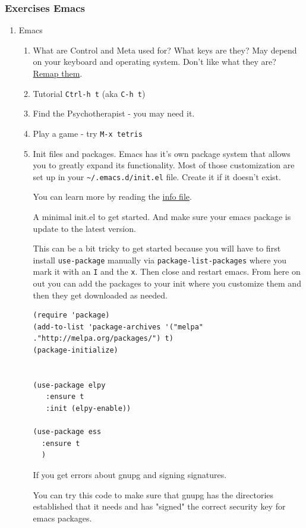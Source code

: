 \documentclass{article}
\begin{document}
\subsubsection{Exercises Emacs}
\label{sec:org3173899}
\begin{enumerate}
\item Emacs
\label{sec:orgfabaa88}
\begin{enumerate}
\item What are Control and Meta used for? What keys are they?
May depend on your keyboard and operating system. Don't like what they are? \href{https://www.x.org/releases/current/doc/man/man1/xmodmap.1.xhtml}{Remap them}.
\item Tutorial \texttt{Ctrl-h t} (aka \texttt{C-h t})
\item Find the Psychotherapist - you may need it.
\item Play a game - try \texttt{M-x tetris}
\item Init files and packages. 
Emacs has it's own package system that allows you to greatly expand its functionality. Most of those customization are set up in your \texttt{\textasciitilde{}/.emacs.d/init.el} file. Create it if it doesn't exist. 

You can learn more by reading the \href{emacs\#Init\%20File}{info file}.

A minimal init.el to get started. And make sure your emacs package is update to the latest version. 

This can be a bit tricky to get started because you will have to first install \texttt{use-package} manually via \texttt{package-list-packages} where you mark it with an \texttt{I} and the \texttt{x}. Then close and restart emacs.  From here on out you can add the packages to your init where you customize them and then they get downloaded as needed. 

\begin{verbatim}
(require 'package)
(add-to-list 'package-archives '("melpa" ."http://melpa.org/packages/") t)
(package-initialize)


(use-package elpy
   :ensure t
   :init (elpy-enable))

(use-package ess
  :ensure t
  )
\end{verbatim}

If you get errors about gnupg and signing signatures.

You can try this code to make sure that gnupg has the directories established that it needs and has "signed" the correct security key for emacs packages. 


\end{enumerate}
\end{enumerate}
\end{document}
